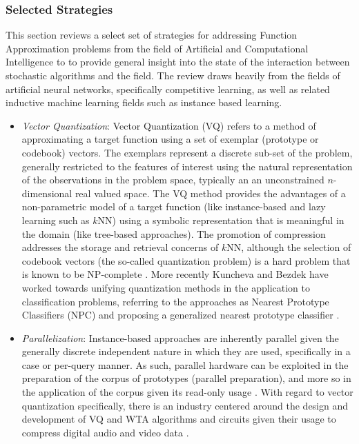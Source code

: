 \documentclass[a4paper, 11pt]{article}
\begin{document}
%
%
\subsubsection{Selected Strategies}
This section reviews a select set of strategies for addressing Function Approximation problems from the field of Artificial and Computational Intelligence to to provide general insight into the state of the interaction between stochastic algorithms and the field. The review draws heavily from the fields of artificial neural networks, specifically competitive learning, as well as related inductive machine learning fields such as instance based learning.

\begin{itemize}
	\item \emph{Vector Quantization}: Vector Quantization (VQ) refers to a method of approximating a target function using a set of exemplar (prototype or codebook) vectors. The exemplars represent a discrete sub-set of the problem, generally restricted to the features of interest using the natural representation of the observations in the problem space, typically an an unconstrained $n$-dimensional real valued space. The VQ method provides the advantages of a non-parametric model of a target function (like instance-based and lazy learning such as $k$NN) using a symbolic representation that is meaningful in the domain (like tree-based approaches). The promotion of compression addresses the storage and retrieval concerns of $k$NN, although the selection of codebook vectors (the so-called quantization problem) is a hard problem that is known to be NP-complete \cite{Garey1982}. More recently Kuncheva and Bezdek have worked towards unifying quantization methods in the application to classification problems, referring to the approaches as Nearest Prototype Classifiers (NPC) and proposing a generalized nearest prototype classifier \cite{Kuncheva1998, Kuncheva1998a}.
	
	\item \emph{Parallelization}: Instance-based approaches are inherently parallel given the generally discrete independent nature in which they are used, specifically in a case or per-query manner. As such, parallel hardware can be exploited in the preparation of the corpus of prototypes (parallel preparation), and more so in the application of the corpus given its read-only usage \cite{Aamodt1994, Nagendra1996, Plaza1997}. With regard to vector quantization specifically, there is an industry centered around the design and development of VQ and WTA algorithms and circuits given their usage to compress digital audio and video data \cite{Nakada1999, Parhi1994}.
	

\end{itemize}
\end{document}
